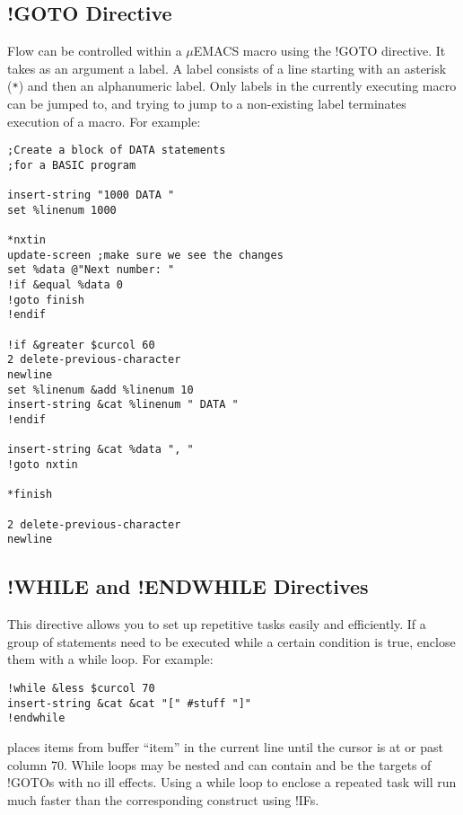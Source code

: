 \subsection{!GOTO Directive}

Flow can be controlled within a $\mu$EMACS macro using the !GOTO
directive. It takes as an argument a label. A label consists of a line
starting with an asterisk (\verb+*+) and then an alphanumeric label. Only
labels in the currently executing macro can be jumped to, and trying to
jump to a non-existing label terminates execution of a macro. For
example:

\begin{verbatim}
;Create a block of DATA statements
;for a BASIC program

insert-string "1000 DATA "
set %linenum 1000

*nxtin
update-screen ;make sure we see the changes
set %data @"Next number: "
!if &equal %data 0
!goto finish
!endif

!if &greater $curcol 60
2 delete-previous-character
newline
set %linenum &add %linenum 10
insert-string &cat %linenum " DATA "
!endif

insert-string &cat %data ", "
!goto nxtin

*finish

2 delete-previous-character
newline
\end{verbatim}

\subsection{!WHILE and !ENDWHILE Directives}

This directive allows you to set up repetitive tasks easily and
efficiently. If a group of statements need to be executed while a
certain condition is true, enclose them with a while loop. For example:

\begin{verbatim}
!while &less $curcol 70
insert-string &cat &cat "[" #stuff "]"
!endwhile
\end{verbatim}

places items from buffer ``item'' in the current line until the cursor is
at or past column 70. While loops may be nested and can contain and be
the targets of !GOTOs with no ill effects. Using a while loop to
enclose a repeated task will run much faster than the corresponding
construct using !IFs.

